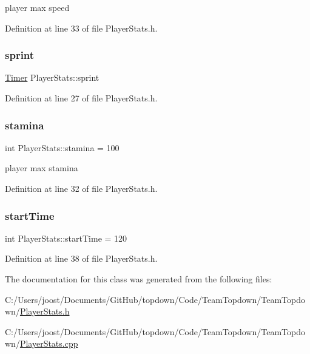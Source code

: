 player max speed 

Definition at line 33 of file Player\+Stats.\+h.

\mbox{\label{struct_player_stats_a22cc49283aedec58d7ff532dc50e1541}} 
\subsubsection{\texorpdfstring{sprint}{sprint}}
{\footnotesize\ttfamily \hyperlink{struct_timer}{Timer} Player\+Stats\+::sprint}



Definition at line 27 of file Player\+Stats.\+h.

\mbox{\label{struct_player_stats_abfb2168c91b0bbcf5a0b996b0bf7d1c7}} 
\subsubsection{\texorpdfstring{stamina}{stamina}}
{\footnotesize\ttfamily int Player\+Stats\+::stamina = 100}

player max stamina 

Definition at line 32 of file Player\+Stats.\+h.

\mbox{\label{struct_player_stats_ad58078805e9b2f5978639b2aa7447e81}} 
\subsubsection{\texorpdfstring{start\+Time}{startTime}}
{\footnotesize\ttfamily int Player\+Stats\+::start\+Time = 120}



Definition at line 38 of file Player\+Stats.\+h.



The documentation for this class was generated from the following files\+:\begin{DoxyCompactItemize}
\item 
C\+:/\+Users/joost/\+Documents/\+Git\+Hub/topdown/\+Code/\+Team\+Topdown/\+Team\+Topdown/\hyperlink{_player_stats_8h}{Player\+Stats.\+h}\item 
C\+:/\+Users/joost/\+Documents/\+Git\+Hub/topdown/\+Code/\+Team\+Topdown/\+Team\+Topdown/\hyperlink{_player_stats_8cpp}{Player\+Stats.\+cpp}\end{DoxyCompactItemize}
